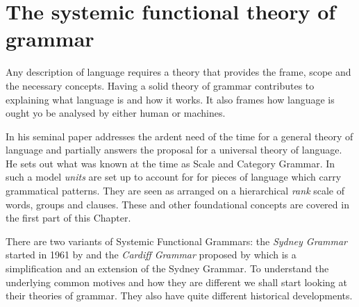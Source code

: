 \chapter{The systemic functional theory of grammar} %
\label{ch:sfg}

Any description of language requires a theory that provides the frame, scope and the necessary concepts. 
Having a solid theory of grammar contributes to explaining what language is and how it works. It also frames how language is ought yo be analysed by either human or machines. 

In his seminal paper \citet{Halliday61} addresses the ardent need of the time for a general theory of language and partially answers the proposal for a universal theory of language. He sets out what was known at the time as Scale and Category Grammar. 
In such a model \textit{units} are set up to account for for pieces of language which carry grammatical patterns. They are seen as arranged on a hierarchical \textit{rank} scale of words, groups and clauses. These and other foundational concepts are covered in the first part of this Chapter. 

There are two variants of Systemic Functional Grammars: the \textit{Sydney Grammar} started in 1961 by \citet{Halliday2002} and the \textit{Cardiff Grammar} proposed by \citet{Fawcett2008} which is a simplification and an extension of the Sydney Grammar. To understand the underlying common motives and how they are different we shall start looking at their theories of grammar. They also have quite different historical developments. 


